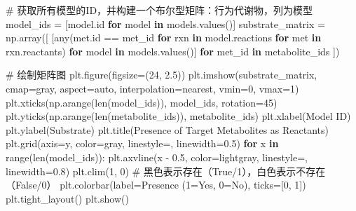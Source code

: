\documentclass[
  letterpaper,
  DIV=11,
  numbers=noendperiod]{scrartcl}
\newenvironment{Shaded}{\begin{snugshade}}{\end{snugshade}}
\newcommand{\BuiltInTok}[1]{\textcolor[rgb]{0.00,0.23,0.31}{#1}}
\newcommand{\CommentTok}[1]{\textcolor[rgb]{0.37,0.37,0.37}{#1}}
\newcommand{\ControlFlowTok}[1]{\textcolor[rgb]{0.00,0.23,0.31}{\textbf{#1}}}
\newcommand{\DecValTok}[1]{\textcolor[rgb]{0.68,0.00,0.00}{#1}}
\newcommand{\FloatTok}[1]{\textcolor[rgb]{0.68,0.00,0.00}{#1}}
\newcommand{\KeywordTok}[1]{\textcolor[rgb]{0.00,0.23,0.31}{\textbf{#1}}}
\newcommand{\NormalTok}[1]{\textcolor[rgb]{0.00,0.23,0.31}{#1}}
\newcommand{\OperatorTok}[1]{\textcolor[rgb]{0.37,0.37,0.37}{#1}}
\newcommand{\StringTok}[1]{\textcolor[rgb]{0.13,0.47,0.30}{#1}}
\begin{document}
\begin{Shaded}
\begin{Highlighting}[]
\CommentTok{\# 获取所有模型的ID，并构建一个布尔型矩阵：行为代谢物，列为模型}
\NormalTok{model\_ids }\OperatorTok{=}\NormalTok{ [model.}\BuiltInTok{id} \ControlFlowTok{for}\NormalTok{ model }\KeywordTok{in}\NormalTok{ models.values()]}
\NormalTok{substrate\_matrix }\OperatorTok{=}\NormalTok{ np.array([}
\NormalTok{    [}\BuiltInTok{any}\NormalTok{(met.}\BuiltInTok{id} \OperatorTok{==}\NormalTok{ met\_id }\ControlFlowTok{for}\NormalTok{ rxn }\KeywordTok{in}\NormalTok{ model.reactions }\ControlFlowTok{for}\NormalTok{ met }\KeywordTok{in}\NormalTok{ rxn.reactants)}
     \ControlFlowTok{for}\NormalTok{ model }\KeywordTok{in}\NormalTok{ models.values()]}
    \ControlFlowTok{for}\NormalTok{ met\_id }\KeywordTok{in}\NormalTok{ metabolite\_ids}
\NormalTok{])}

\CommentTok{\# 绘制矩阵图}
\NormalTok{plt.figure(figsize}\OperatorTok{=}\NormalTok{(}\DecValTok{24}\NormalTok{, }\FloatTok{2.5}\NormalTok{))}
\NormalTok{plt.imshow(substrate\_matrix, cmap}\OperatorTok{=}\StringTok{\textquotesingle{}gray\textquotesingle{}}\NormalTok{, aspect}\OperatorTok{=}\StringTok{\textquotesingle{}auto\textquotesingle{}}\NormalTok{, interpolation}\OperatorTok{=}\StringTok{\textquotesingle{}nearest\textquotesingle{}}\NormalTok{, vmin}\OperatorTok{=}\DecValTok{0}\NormalTok{, vmax}\OperatorTok{=}\DecValTok{1}\NormalTok{)}
\NormalTok{plt.xticks(np.arange(}\BuiltInTok{len}\NormalTok{(model\_ids)), model\_ids, rotation}\OperatorTok{=}\DecValTok{45}\NormalTok{)}
\NormalTok{plt.yticks(np.arange(}\BuiltInTok{len}\NormalTok{(metabolite\_ids)), metabolite\_ids)}
\NormalTok{plt.xlabel(}\StringTok{\textquotesingle{}Model ID\textquotesingle{}}\NormalTok{)}
\NormalTok{plt.ylabel(}\StringTok{\textquotesingle{}Substrate\textquotesingle{}}\NormalTok{)}
\NormalTok{plt.title(}\StringTok{\textquotesingle{}Presence of Target Metabolites as Reactants\textquotesingle{}}\NormalTok{)}
\NormalTok{plt.grid(axis}\OperatorTok{=}\StringTok{\textquotesingle{}y\textquotesingle{}}\NormalTok{, color}\OperatorTok{=}\StringTok{\textquotesingle{}gray\textquotesingle{}}\NormalTok{, linestyle}\OperatorTok{=}\StringTok{\textquotesingle{}{-}{-}\textquotesingle{}}\NormalTok{, linewidth}\OperatorTok{=}\FloatTok{0.5}\NormalTok{)}
\ControlFlowTok{for}\NormalTok{ x }\KeywordTok{in} \BuiltInTok{range}\NormalTok{(}\BuiltInTok{len}\NormalTok{(model\_ids)):}
\NormalTok{    plt.axvline(x }\OperatorTok{{-}} \FloatTok{0.5}\NormalTok{, color}\OperatorTok{=}\StringTok{\textquotesingle{}lightgray\textquotesingle{}}\NormalTok{, linestyle}\OperatorTok{=}\StringTok{\textquotesingle{}{-}\textquotesingle{}}\NormalTok{, linewidth}\OperatorTok{=}\FloatTok{0.8}\NormalTok{)}
\NormalTok{plt.clim(}\DecValTok{1}\NormalTok{, }\DecValTok{0}\NormalTok{)  }\CommentTok{\# 黑色表示存在（True/1），白色表示不存在（False/0）}
\NormalTok{plt.colorbar(label}\OperatorTok{=}\StringTok{\textquotesingle{}Presence (1=Yes, 0=No)\textquotesingle{}}\NormalTok{, ticks}\OperatorTok{=}\NormalTok{[}\DecValTok{0}\NormalTok{, }\DecValTok{1}\NormalTok{])}
\NormalTok{plt.tight\_layout()}
\NormalTok{plt.show()}


\end{Highlighting}
\end{Shaded}
\end{document}
